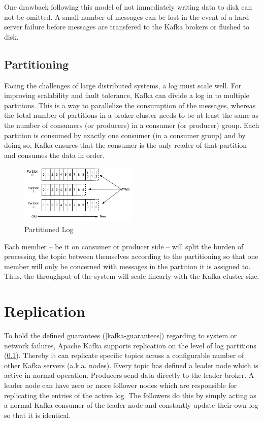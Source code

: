 One drawback following this model of not immediately writing data to disk can not be
omitted. A small number of messages can be lost in the event of a hard server
failure before messages are transfered to the Kafka brokers or flushed to disk.
\cite{goodhope2012building}

\subsection{Partitioning}
\label{kafka-partitioning}
Facing the challenges of large distributed systems, a log must scale well. For
improving scalability and fault tolerance, Kafka can divide a log in to multiple
partitions. This is a way to parallelize the consumption of the messages, whereas
the total number of partitions in a broker cluster needs to be at least the same
as the number of consumers (or producers) in a consumer (or producer) group.
Each partition is consumed by exactly one consumer (in a consumer group) and by
doing so, Kafka ensures that the consumer is the only reader of that partition
and consumes the data in order.

\begin{figure}[H]
    \centering
    \includegraphics[width=0.5\textwidth]{images/log_anatomy.png}
    \caption{Partitioned Log \cite{apachekafka}}
    \label{fig:the-log}
\end{figure}

Each member -- be it on consumer or producer side -- will split the burden of
processing the topic between themselves according to the partitioning so that
one member will only be concerned with messages in the partition it is
assigned to. Thus, the throughput of the system will scale linearly with the
Kafka cluster size. \cite{apachekafka}

\section{Replication}
\label{kafka-replication}
To hold the defined guarantees (\ref{kafka-guarantees}) regarding to system
or network failures, Apache Kafka supports replication on the level of log
partitions (\ref{kafka-partitioning}). Thereby it can replicate specific topics
across a configurable number of other Kafka servers (a.k.a. nodes). Every
topic has defined a leader node which is active in normal operation. Producers
send data directly to the leader broker. A leader node can have zero or
more follower nodes which are responsible for replicating the entries of the active
log. The followers do this by simply acting as a normal Kafka consumer of the
leader node and constantly update their own log so that it is identical.
\cite{apachekafka}

